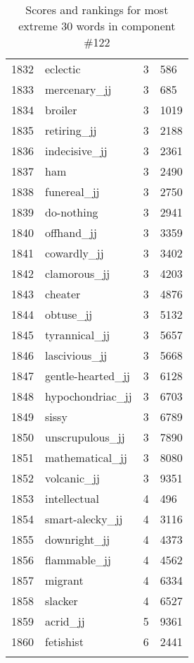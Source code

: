 \begin{longtable}[!htbp]{| rlr@{.}l |}
    1832 & eclectic & 3 & 586 \\
    1833 & mercenary\_jj & 3 & 685 \\
    1834 & broiler & 3 & 1019 \\
    1835 & retiring\_jj & 3 & 2188 \\
    1836 & indecisive\_jj & 3 & 2361 \\
    1837 & ham & 3 & 2490 \\
    1838 & funereal\_jj & 3 & 2750 \\
    1839 & do-nothing & 3 & 2941 \\
    1840 & offhand\_jj & 3 & 3359 \\
    1841 & cowardly\_jj & 3 & 3402 \\
    1842 & clamorous\_jj & 3 & 4203 \\
    1843 & cheater & 3 & 4876 \\
    1844 & obtuse\_jj & 3 & 5132 \\
    1845 & tyrannical\_jj & 3 & 5657 \\
    1846 & lascivious\_jj & 3 & 5668 \\
    1847 & gentle-hearted\_jj & 3 & 6128 \\
    1848 & hypochondriac\_jj & 3 & 6703 \\
    1849 & sissy & 3 & 6789 \\
    1850 & unscrupulous\_jj & 3 & 7890 \\
    1851 & mathematical\_jj & 3 & 8080 \\
    1852 & volcanic\_jj & 3 & 9351 \\
    1853 & intellectual & 4 & 496 \\
    1854 & smart-alecky\_jj & 4 & 3116 \\
    1855 & downright\_jj & 4 & 4373 \\
    1856 & flammable\_jj & 4 & 4562 \\
    1857 & migrant & 4 & 6334 \\
    1858 & slacker & 4 & 6527 \\
    1859 & acrid\_jj & 5 & 9361 \\
    1860 & fetishist & 6 & 2441 \\
    \hline
    \caption{Scores and rankings for most extreme 30 words in component \#122} \\
\end{longtable}
